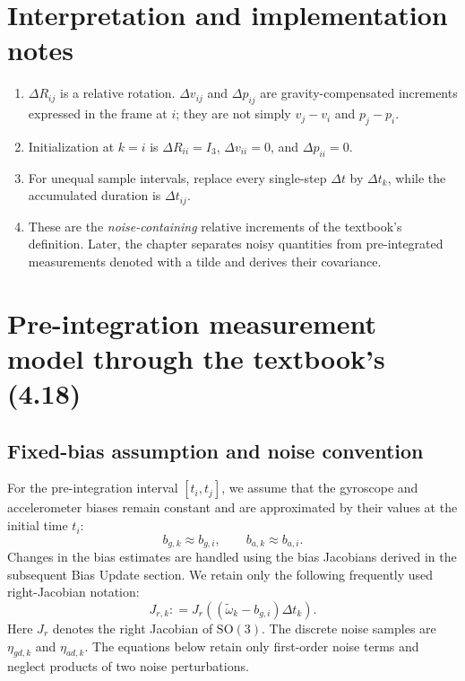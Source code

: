 \documentclass[11pt,a4paper]{article}
\newcommand{\SO}{\mathrm{SO}}
\newcommand{\defeq}{\mathrel{\mathop:}=}
\begin{document}
\section{Interpretation and implementation notes}
\begin{enumerate}[leftmargin=*]
\item $\Delta R_{ij}$ is a relative rotation. $\Delta v_{ij}$ and $\Delta p_{ij}$ are gravity-compensated increments expressed in the frame at $i$; they are not simply $v_j-v_i$ and $p_j-p_i$.
\item Initialization at $k=i$ is $\Delta R_{ii}=I_3$, $\Delta v_{ii}=0$, and $\Delta p_{ii}=0$.
\item For unequal sample intervals, replace every single-step $\Delta t$ by $\Delta t_k$, while the accumulated duration is $\Delta t_{ij}$.
\item These are the \emph{noise-containing} relative increments of the textbook's definition. Later, the chapter separates noisy quantities from pre-integrated measurements denoted with a tilde and derives their covariance.
\end{enumerate}

\section{Pre-integration measurement model through the textbook's (4.18)}
\subsection{Fixed-bias assumption and noise convention}
For the pre-integration interval $[t_i,t_j]$, we assume that the
gyroscope and accelerometer biases remain constant and are approximated
by their values at the initial time $t_i$:
\begin{equation}
 b_{g,k}\approx b_{g,i},\qquad b_{a,k}\approx b_{a,i}.
\end{equation}
Changes in the bias estimates are handled using the bias Jacobians
derived in the subsequent Bias Update section. We retain only the
following frequently used right-Jacobian notation:
\begin{equation}
J_{r,k}\defeq J_r\!\left((\tilde\omega_k-b_{g,i})\Delta t_k\right).
\end{equation}
Here $J_r$ denotes the right Jacobian of $\SO(3)$.
The discrete noise samples are $\eta_{gd,k}$ and $\eta_{ad,k}$.
The equations below retain only first-order noise terms and neglect
products of two noise perturbations.
\end{document}
